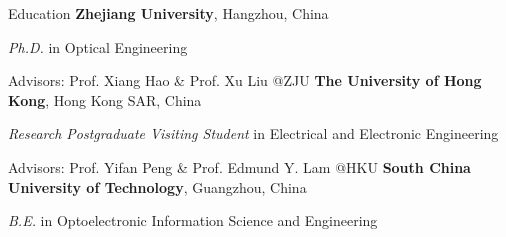 \begin{rubric}{Education}
	\entry*[2018/09 -- 2023/12]%
	\textbf{Zhejiang University}, Hangzhou, China
	\par \textit{Ph.D.} in Optical Engineering
	\par Advisors: Prof. Xiang Hao \& Prof. Xu Liu @ZJU
	\entry*[2022/12 -- 2023/04]%
	\textbf{The University of Hong Kong}, Hong Kong SAR, China
	\par \textit{Research Postgraduate Visiting Student} in Electrical and Electronic Engineering
	\par Advisors: Prof. Yifan Peng \& Prof. Edmund Y. Lam @HKU
	\entry*[2014/09 -- 2018/06]%
	\textbf{South China University of Technology}, Guangzhou, China
	\par \textit{B.E.} in Optoelectronic Information Science and Engineering
\end{rubric}